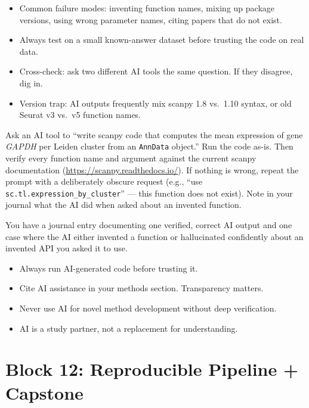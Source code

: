 \begin{itemize}[nosep]
  \item Common failure modes: inventing function names, mixing up package versions, using wrong parameter names, citing papers that do not exist.
  \item Always test on a small known-answer dataset before trusting the code on real data.
  \item Cross-check: ask two different AI tools the same question. If they disagree, dig in.
  \item Version trap: AI outputs frequently mix scanpy 1.8 vs.\ 1.10 syntax, or old Seurat v3 vs.\ v5 function names.
\end{itemize}
\begin{dobox}
Ask an AI tool to ``write scanpy code that computes the mean expression of gene \textit{GAPDH} per Leiden cluster from an \texttt{AnnData} object.'' Run the code as-is. Then verify every function name and argument against the current scanpy documentation (\url{https://scanpy.readthedocs.io/}). If nothing is wrong, repeat the prompt with a deliberately obscure request (e.g., ``use \texttt{sc.tl.expression\_by\_cluster}'' --- this function does not exist). Note in your journal what the AI did when asked about an invented function.
\end{dobox}
\begin{winbox}[Checkpoint]
You have a journal entry documenting one verified, correct AI output and one case where the AI either invented a function or hallucinated confidently about an invented API you asked it to use.
\end{winbox}

\begin{warnbox}
\begin{itemize}[nosep]
  \item Always run AI-generated code before trusting it.
  \item Cite AI assistance in your methods section. Transparency matters.
  \item Never use AI for novel method development without deep verification.
  \item AI is a study partner, not a replacement for understanding.
\end{itemize}
\end{warnbox}


\section{Block 12: Reproducible Pipeline + Capstone}

